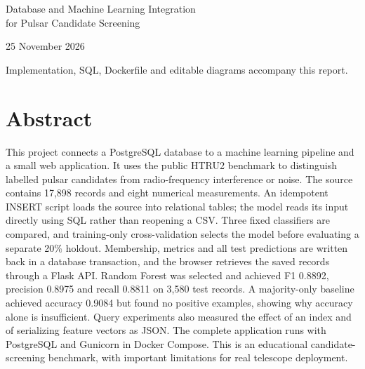 \documentclass[11pt,a4paper]{article}
\begin{document}
\begin{titlepage}\centering
\vspace*{2cm}{\large Biruni University\\Faculty of Engineering and Natural Sciences}\par
\vspace{1.3cm}{\Large CMP307 -- Database Management Systems}\par
\vspace{1.7cm}{\Huge\bfseries Pulsar Scout}\par\vspace{.5cm}
{\Large Database and Machine Learning Integration\\for Pulsar Candidate Screening}\par
\vspace{1.5cm}{\large Project Report}\par
\vspace{1.3cm}{\Large \"Ozcan \"Ozt\"urk\\Student ID: 230408011}\par
\vfill{25 November 2026}\par
\smallskip\small Implementation, SQL, Dockerfile and editable diagrams accompany this report.
\end{titlepage}

\section*{Abstract}
This project connects a PostgreSQL database to a machine learning pipeline and a small web application. It uses the public HTRU2 benchmark to distinguish labelled pulsar candidates from radio-frequency interference or noise. The source contains 17,898 records and eight numerical measurements. An idempotent INSERT script loads the source into relational tables; the model reads its input directly using SQL rather than reopening a CSV. Three fixed classifiers are compared, and training-only cross-validation selects the model before evaluating a separate 20\% holdout. Membership, metrics and all test predictions are written back in a database transaction, and the browser retrieves the saved records through a Flask API. Random Forest was selected and achieved F1 0.8892, precision 0.8975 and recall 0.8811 on 3,580 test records. A majority-only baseline achieved accuracy 0.9084 but found no positive examples, showing why accuracy alone is insufficient. Query experiments also measured the effect of an index and of serializing feature vectors as JSON. The complete application runs with PostgreSQL and Gunicorn in Docker Compose. This is an educational candidate-screening benchmark, with important limitations for real telescope deployment.
\end{document}
